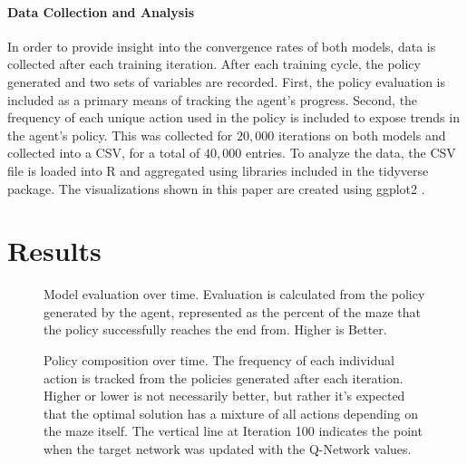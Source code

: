 \documentclass[12pt]{article}
\begin{document}
\paragraph{Data Collection and Analysis}

In order to provide insight into the convergence rates of both models, data is collected after each training iteration.
After each training cycle, the policy generated and two sets of variables are recorded.
First, the policy evaluation is included as a primary means of tracking the agent's progress.
Second, the frequency of each unique action used in the policy is included to expose trends in the agent's policy.
This was collected for $20,000$ iterations on both models and collected into a CSV, for a total of $40,000$ entries.
To analyze the data, the CSV file is loaded into R \cite{lang_r} and aggregated using libraries included in the tidyverse \cite{lib_tidyverse} package.
The visualizations shown in this paper are created using ggplot2 \cite{lib_ggplot2}.

\section{Results}


\begin{figure}[h]
	\begin{center}
	
	\end{center}
    \caption{Model evaluation over time. Evaluation is calculated from the policy generated by the agent, represented as the percent of the maze that the policy successfully reaches the end from. Higher is Better.}
		\label{fig:evaluation}
\end{figure}

\begin{figure}[h]
	\begin{center}
	
	\end{center}
	\caption{Policy composition over time. The frequency of each individual action is tracked from the policies generated after each iteration. Higher or lower is not necessarily better, but rather it's expected that the optimal solution has a mixture of all actions depending on the maze itself. The vertical line at Iteration 100 indicates the point when the target network was updated with the Q-Network values.}
	\label{fig:directional}
\end{figure}
\end{document}

